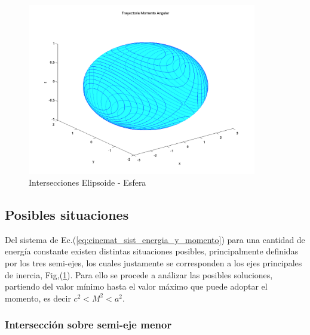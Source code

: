 \documentclass[oneside,a4paper,english,links]{amca}
\begin{document}
\begin{figure}[H]
\centering
\includegraphics[width=10cm]{Figuras/Intersecciones Elipsoide - EsferaotroDT2.png}
\caption{Intersecciones Elipsoide - Esfera}
\label{fig:cinemat_Intersecciones_Elipsoide_Esfera}
\end{figure}

\subsection{Posibles situaciones}
\label{sec:cinemat_posibles_situaciones_interseccion_elipsoide_esfera}

Del sistema de Ec.(\ref{eq:cinemat_sist_energia_y_momento}) para una cantidad de energ\'ia constante existen distintas situaciones posibles, principalmente definidas por los tres semi-ejes, los cuales justamente se corresponden a los ejes principales de inercia, Fig,(\ref{fig:cinemat_Intersecciones_Elipsoide_Esfera}). Para ello se procede a an\'alizar las posibles soluciones, partiendo del valor m\'inimo hasta el valor m\'aximo que puede adoptar el momento, es decir $c^2<M^2<a^2$.

\subsubsection{Intersecci\'on sobre semi-eje menor}
\label{sec:cinemat_Interseccion_sobre_semi-eje_menor}

\end{document}
